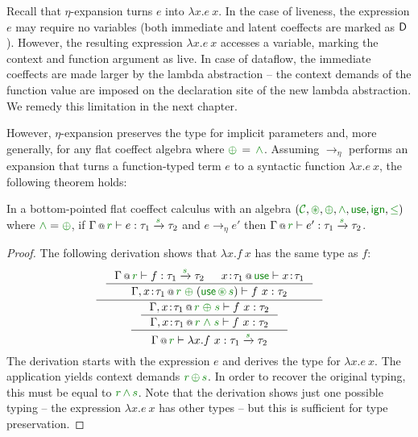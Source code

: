 Recall that $\eta$-expansion turns $e$ into $\lambda x.e~x$. In the case of liveness, the
expression $e$ may require no variables (both immediate and latent coeffects are marked as
$\textnormal{\sffamily D}$). However, the resulting expression $\lambda x.e~x$ accesses a variable,
marking the context and function argument as live. In case of dataflow, the immediate coeffects
are made larger by the lambda abstraction -- the context demands of the function value are
imposed on the declaration site of the new lambda abstraction. We remedy this limitation in
the next chapter.

However, $\eta$-expansion preserves the type for implicit parameters and, more generally,
for any flat coeffect algebra where $\cpar \,=\, \czip$. Assuming $\rightarrow_\eta$
performs an expansion that turns a function-typed term $e$ to a
syntactic function $\lambda x.e~x$, the following theorem holds:

\begin{theorem}
In a bottom-pointed flat coeffect calculus with an algebra $(\C, \cseq, \cpar, \czip, \cunit, \czero, \cleq)$
where $\czip = \cpar$, if $\coctx{\Gamma}{\cclrd{r}} \vdash e : \tau_1 \xrightarrow{\cclrd{s}} \tau_2$
and $e \rightarrow_\eta e'$ then $\coctx{\Gamma}{\cclrd{r}} \vdash e' : \tau_1 \xrightarrow{\cclrd{s}} \tau_2 $.
\end{theorem}
\begin{proof}
The following derivation shows that $\lambda x.f~x$ has the same type as $f$:
\begin{equation*}
\inference
  { \inference
    { \coctx{\Gamma}{\cclrd{r}} \vdash f : \tau_1 \xrightarrow{\cclrd{s}} \tau_2 &
      \coctx{x\!:\!\tau_1}{\cunit} \vdash x\!:\!\tau_1 }
    { \coctx{\Gamma, x\!:\!\tau_1}{\cclrd{r} \;\cpar\; (\cunit \,\cseq\, \cclrd{s}) } \vdash f~x : \tau_2 } }
  { \inference
    { \inference
      { \coctx{\Gamma, x\!:\!\tau_1}{\cclrd{r} \;\cpar\; \cclrd{s} } \vdash f~x : \tau_2 }
      { \coctx{\Gamma, x\!:\!\tau_1}{\cclrd{r} \;\czip\; \cclrd{s} } \vdash f~x : \tau_2 } }
    { \coctx{\Gamma}{ \cclrd{r} } \vdash \lambda x.f~x : \tau_1 \xrightarrow{\cclrd{s}} \tau_2 } }
\end{equation*}
%
The derivation starts with the expression $e$ and derives the type for $\lambda x.e~x$. The
application yields context demands $\cclrd{r}\,\cpar\,\cclrd{s}$. In order to recover the
original typing, this must be equal to $\cclrd{r}\,\czip\,\cclrd{s}$. Note that the derivation
shows just one possible typing -- the expression $\lambda x.e~x$ has other types -- but
this is sufficient for type preservation.
\end{proof}

